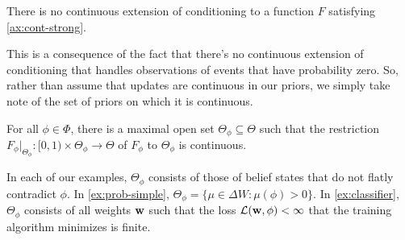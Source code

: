 %
\begin{prop}
	There is no continuous extension of conditioning to a function
	$F$ satisfying \cref{ax:cont-strong}.
\end{prop}
This is a consequence of the fact that there's no 
continuous extension of conditioning that handles
observations of events that have probability zero.
%
So, rather than assume that updates are continuous in our priors, we
simply take note of the set of priors on which it is continuous.

\begin{prop}
	For all $\phi \in \Phi$,
	there is a maximal open set $\Theta_\phi \subseteq \Theta$ such that
	the restriction $F_{\phi} |_{\Theta_\phi} : [0,1) \times \Theta_\phi \to \Theta$
	of $F_\phi$ to $\Theta_\phi$ is continuous. 	
\end{prop}
In each of our examples, $\Theta_\phi$ consists of those
of belief states that do not flatly contradict $\phi$.
In \cref{ex:prob-simple}, $\Theta_\phi = \{ \mu \in \Delta W : \mu(\phi) > 0\}$.
In \cref{ex:classifier}, $\Theta_\phi$ consists of all weights $\mathbf{w}$ 
such that
the loss $\mathcal L(\mathbf{w}, \phi) < \infty$ that the training algorithm minimizes is finite.



